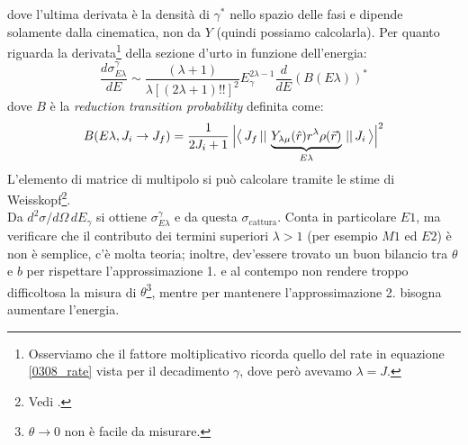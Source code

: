 dove l'ultima derivata è la densità di $\gamma^*$ nello spazio delle fasi e dipende solamente dalla cinematica, non da $Y$ (quindi possiamo calcolarla). Per quanto riguarda la derivata\footnote{Osserviamo che il fattore moltiplicativo ricorda quello del rate in equazione \eqref{0308_rate} vista per il decadimento $\gamma$, dove però avevamo $\lambda = J$.} della sezione d'urto in funzione dell'energia:
$$\frac{d\sigma_{E\lambda}^\gamma}{dE} \sim \frac{(\lambda +1)}{\lambda[(2\lambda + 1)!!]^2} E_\gamma^{2\lambda -1} \frac{d}{dE}(B(E\lambda))^*$$
dove $B$ è la \textit{reduction transition probability} definita come:
$$B(E\lambda, J_i \to J_f) = \frac{1}{2J_i +1 } \: \Bigl | \bigl\langle\, J_f\, ||\,\underbrace{Y_{\lambda \mu}(\hat{r}) r^\lambda \rho(\vec{r})}_{E\lambda}\, ||\,J_i\, \bigr\rangle \Bigr |^2$$
L'elemento di matrice di multipolo si può calcolare tramite le stime di Weisskopf\footnote{Vedi .}.\\
Da $d^2\sigma/d\Omega\,dE_\gamma$ si ottiene $\sigma_{E\lambda}^\gamma$ e da questa $\sigma_\text{cattura}$. Conta in particolare $E1$, ma verificare che il contributo dei termini superiori $\lambda >1$ (per esempio $M1$ ed $E2$) è  non è semplice, c'è molta teoria; inoltre, dev'essere trovato un buon bilancio tra $\theta$ e $b$ per rispettare l'approssimazione 1. e al contempo non rendere troppo difficoltosa la misura di $\theta$\footnote{$\theta\to 0$ non è facile da misurare.}, mentre per mantenere l'approssimazione 2. bisogna aumentare l'energia.

